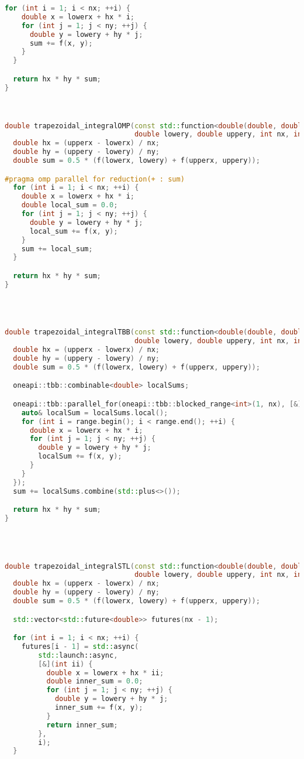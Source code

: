 \documentclass[]{article}
\theoremstyle{remark}
\theoremstyle{definition}
\begin{document}
\begin{lstlisting}[language=C++]
  for (int i = 1; i < nx; ++i) {
    double x = lowerx + hx * i;
    for (int j = 1; j < ny; ++j) {
      double y = lowery + hy * j;
      sum += f(x, y);
    }
  }

  return hx * hy * sum;
}



double trapezoidal_integralOMP(const std::function<double(double, double)>& f, double lowerx, double upperx,
                               double lowery, double uppery, int nx, int ny) {
  double hx = (upperx - lowerx) / nx;
  double hy = (uppery - lowery) / ny;
  double sum = 0.5 * (f(lowerx, lowery) + f(upperx, uppery));

#pragma omp parallel for reduction(+ : sum)
  for (int i = 1; i < nx; ++i) {
    double x = lowerx + hx * i;
    double local_sum = 0.0;
    for (int j = 1; j < ny; ++j) {
      double y = lowery + hy * j;
      local_sum += f(x, y);
    }
    sum += local_sum;
  }

  return hx * hy * sum;
}




double trapezoidal_integralTBB(const std::function<double(double, double)>& f, double lowerx, double upperx,
                               double lowery, double uppery, int nx, int ny) {
  double hx = (upperx - lowerx) / nx;
  double hy = (uppery - lowery) / ny;
  double sum = 0.5 * (f(lowerx, lowery) + f(upperx, uppery));

  oneapi::tbb::combinable<double> localSums;

  oneapi::tbb::parallel_for(oneapi::tbb::blocked_range<int>(1, nx), [&](const oneapi::tbb::blocked_range<int>& range) {
    auto& localSum = localSums.local();
    for (int i = range.begin(); i < range.end(); ++i) {
      double x = lowerx + hx * i;
      for (int j = 1; j < ny; ++j) {
        double y = lowery + hy * j;
        localSum += f(x, y);
      }
    }
  });
  sum += localSums.combine(std::plus<>());

  return hx * hy * sum;
}




double trapezoidal_integralSTL(const std::function<double(double, double)>& f, double lowerx, double upperx,
                               double lowery, double uppery, int nx, int ny) {
  double hx = (upperx - lowerx) / nx;
  double hy = (uppery - lowery) / ny;
  double sum = 0.5 * (f(lowerx, lowery) + f(upperx, uppery));

  std::vector<std::future<double>> futures(nx - 1);

  for (int i = 1; i < nx; ++i) {
    futures[i - 1] = std::async(
        std::launch::async,
        [&](int ii) {
          double x = lowerx + hx * ii;
          double inner_sum = 0.0;
          for (int j = 1; j < ny; ++j) {
            double y = lowery + hy * j;
            inner_sum += f(x, y);
          }
          return inner_sum;
        },
        i);
  }


\end{lstlisting}
\end{document}

